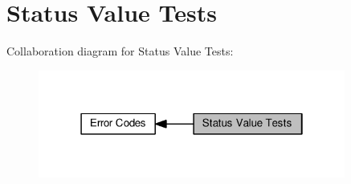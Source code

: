 \hypertarget{group__APR__STATUS__IS}{}\section{Status Value Tests}
\label{group__APR__STATUS__IS}
Collaboration diagram for Status Value Tests\+:
\nopagebreak
\begin{figure}[H]
\begin{center}
\leavevmode
\includegraphics[width=286pt]{group__APR__STATUS__IS}
\end{center}
\end{figure}
